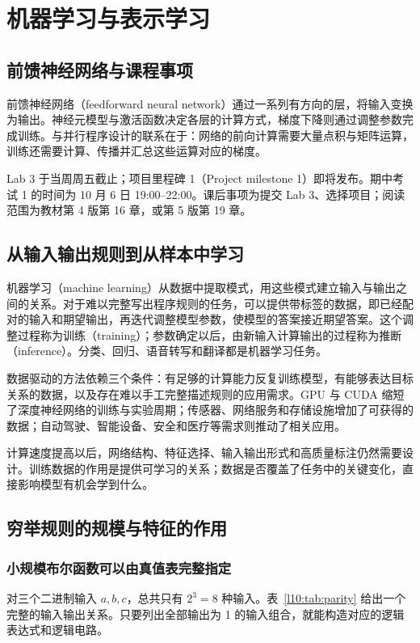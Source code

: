\section{机器学习与表示学习}
\subsection{前馈神经网络与课程事项}

前馈神经网络（feedforward neural network）通过一系列有方向的层，将输入变换为输出。神经元模型与激活函数决定各层的计算方式，梯度下降则通过调整参数完成训练。与并行程序设计的联系在于：网络的前向计算需要大量点积与矩阵运算，训练还需要计算、传播并汇总这些运算对应的梯度。

\begin{overviewbox}[title={课程事项：2026年9月24日}]
Lab 3 于当周周五截止；项目里程碑 1（Project milestone 1）即将发布。期中考试 1 的时间为 10 月 6 日 19:00--22:00。课后事项为提交 Lab 3、选择项目；阅读范围为教材第 4 版第 16 章，或第 5 版第 19 章。
\end{overviewbox}

\subsection{从输入输出规则到从样本中学习}

机器学习（machine learning）从数据中提取模式，用这些模式建立输入与输出之间的关系。对于难以完整写出程序规则的任务，可以提供带标签的数据，即已经配对的输入和期望输出，再迭代调整模型参数，使模型的答案接近期望答案。这个调整过程称为训练（training）；参数确定以后，由新输入计算输出的过程称为推断（inference）。分类、回归、语音转写和翻译都是机器学习任务。

数据驱动的方法依赖三个条件：有足够的计算能力反复训练模型，有能够表达目标关系的数据，以及存在难以手工完整描述规则的应用需求。GPU 与 CUDA 缩短了深度神经网络的训练与实验周期；传感器、网络服务和存储设施增加了可获得的数据；自动驾驶、智能设备、安全和医疗等需求则推动了相关应用。

计算速度提高以后，网络结构、特征选择、输入输出形式和高质量标注仍然需要设计。训练数据的作用是提供可学习的关系；数据是否覆盖了任务中的关键变化，直接影响模型有机会学到什么。

\subsection{穷举规则的规模与特征的作用}

\subsubsection{小规模布尔函数可以由真值表完整指定}
对三个二进制输入 $a,b,c$，总共只有 $2^3=8$ 种输入。表~\ref{l10:tab:parity} 给出一个完整的输入输出关系。只要列出全部输出为 1 的输入组合，就能构造对应的逻辑表达式和逻辑电路。

